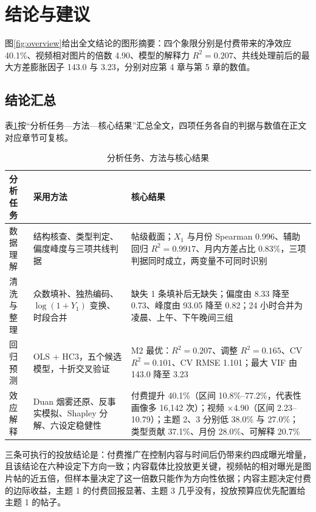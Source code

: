 \section{结论与建议}

图\ref{fig:overview}给出全文结论的图形摘要：四个象限分别是付费带来的净效应 40.1\%、视频相对图片的倍数 4.90、模型的解释力 $R^2=0.207$、共线处理前后的最大方差膨胀因子 143.0 与 3.23，分别对应第 4 章与第 5 章的数值。

\subsection{结论汇总}

表\ref{tab:summary}按“分析任务—方法—核心结果”汇总全文，四项任务各自的判据与数值在正文对应章节可复核。

\begin{table}[htbp]
  \centering
  \caption{分析任务、方法与核心结果}
  \label{tab:summary}
  \setlength{\tabcolsep}{4pt}\renewcommand{\arraystretch}{1.05}
  \begin{tabular}{>{\centering\arraybackslash}p{}>{\centering\arraybackslash}p{}>{\centering\arraybackslash}p{}}
    \toprule
    分析任务 & 采用方法 & 核心结果 \\
    \midrule
    数据理解 & 结构核查、类型判定、偏度峰度与三项共线判据 & 帖级截面；$X_1$ 与月份 Spearman 0.996、辅助回归 $R^2=0.9917$、月内方差占比 0.83\%，三项判据同时成立，两变量不可同时识别 \\
    清洗与整理 & 众数填补、独热编码、$\log(1+Y_1)$ 变换、时段合并 & 缺失 1 条填补后无缺失；偏度由 8.33 降至 0.73、峰度由 93.05 降至 0.82；24 小时合并为凌晨、上午、下午晚间三组 \\
    回归预测 & OLS + HC3，五个候选模型，十折交叉验证 & M2 最优：$R^2=0.207$、调整 $R^2=0.165$、CV $R^2=0.101$、CV RMSE 1.101；最大 VIF 由 143.0 降至 3.23 \\
    效应解释 & Duan 烟雾还原、反事实模拟、Shapley 分解、六设定稳健性 & 付费提升 40.1\%（区间 10.8\%--77.2\%，代表性画像多 16,142 次）；视频 ×4.90（区间 2.23--10.79）；主题 2、3 分别低 38.0\% 与 27.0\%；类型贡献 37.1\%、月份 28.0\%、可解释 20.7\% \\
    \bottomrule
  \end{tabular}
\end{table}

三条可执行的投放结论是：付费推广在控制内容与时间后仍带来约四成曝光增量，且该结论在六种设定下方向一致；内容载体比投放更关键，视频帖的相对曝光是图片帖的近五倍，但样本量决定了这一倍数只能作为方向性依据；内容主题决定付费的边际收益，主题 1 的付费回报显著、主题 3 几乎没有，投放预算应优先配置给主题 1 的帖子。

